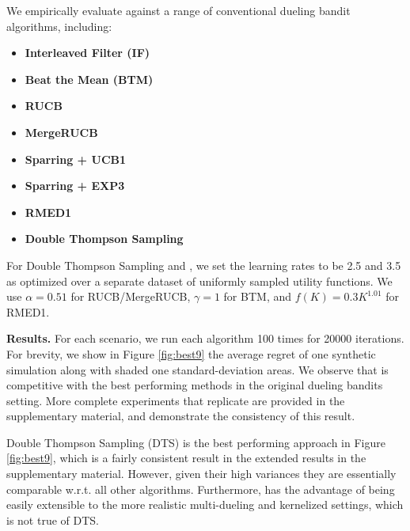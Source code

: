 We empirically evaluate against a range of conventional dueling bandit algorithms, including:
\begin{itemize}
\vspace{-0.1in}
\item \textbf{Interleaved Filter (IF)} \citep{yue2012k}
\vspace{-.1in}
\item \textbf{Beat the Mean (BTM)} \citep{yue2011beat}
\vspace{-.1in}
\item \textbf{RUCB} \citep{zoghi2014relative}
\vspace{-.1in}
\item \textbf{MergeRUCB} \citep{zoghi2015mergerucb}
\vspace{-.1in}
\item \textbf{Sparring + UCB1} \citep{ailon2014reducing}
\vspace{-.1in}
\item \textbf{Sparring + EXP3} \citep{dudik2015contextual}
\vspace{-.1in}
\item \textbf{RMED1} \citep{komiyama2015regret}
\vspace{-.1in}
\item \textbf{Double Thompson Sampling} \citep{wu2016doublets}
\end{itemize}
For Double Thompson Sampling and \multisparring, we set the learning rates to be 2.5 and 3.5 as optimized over a separate dataset of uniformly sampled utility functions. We use $\alpha=0.51$ for RUCB/MergeRUCB, $\gamma=1$ for BTM, and $f(K) = 0.3K^{1.01}$ for RMED1.


\textbf{Results.}
For each scenario, we run each algorithm 100 times for 20000 iterations. For brevity, we show in Figure \ref{fig:best9} the average regret of one synthetic simulation along with shaded one standard-deviation areas.  We observe that \selfsparring is competitive with the best performing methods in the original dueling bandits setting.  More complete experiments that replicate \citet{ailon2014reducing} are provided in the supplementary material, and demonstrate the consistency of this result.


Double Thompson Sampling (DTS) is the best performing approach in Figure \ref{fig:best9}, which is a fairly consistent result in the extended results in the supplementary material.
However, given their high variances they are essentially comparable w.r.t. all other algorithms. 
Furthermore, \multisparring has the advantage of being easily extensible to the more realistic multi-dueling and kernelized settings, which is not true of DTS.


